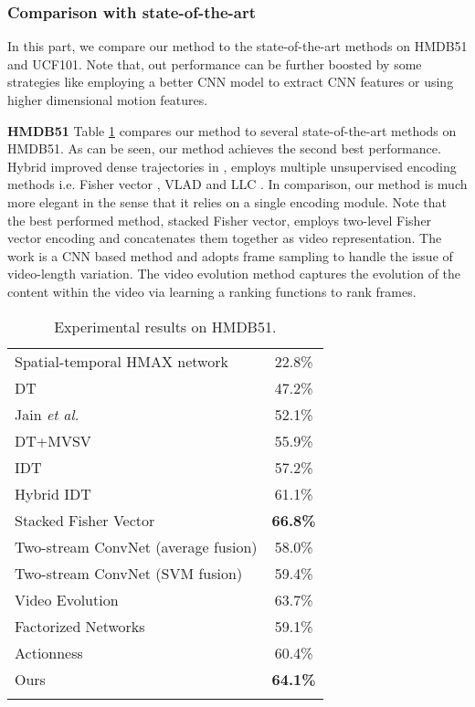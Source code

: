 \documentclass[journal]{IEEEtran}
\begin{document}
\subsubsection{Comparison with state-of-the-art}
In this part, we compare our method to the state-of-the-art methods on HMDB51 and UCF101. Note that, out performance can be further boosted by some strategies like employing a better CNN model \cite{Simonyan15} to extract CNN features or using higher dimensional motion features.

\noindent \textbf{HMDB51}
Table \ref{tab:overall-hmdb51} compares our method to several state-of-the-art methods on HMDB51. As can be seen, our method achieves the second best performance. Hybrid improved dense trajectories in \cite{peng14}, employs multiple unsupervised encoding methods i.e. Fisher vector \cite{Perronnin:2010}, VLAD \cite{VLAD} and LLC \cite{llc}. In comparison, our method is much more elegant in the sense that it relies on a single encoding module. Note that the best performed method, stacked Fisher vector, \cite{peng:stack} employs two-level Fisher vector encoding and concatenates them together as video representation. The work \cite{Andrew14} is a CNN based method and adopts frame sampling to handle the issue of video-length variation. The video evolution method \cite{Fernando2015a} captures the evolution of the content within the video via learning a ranking functions to rank frames.

\begin{table}[htbp]\normalsize
\caption{Experimental results on HMDB51.}
  \centering

  \renewcommand{\arraystretch}{1.1}
    \begin{tabular*}{8cm}{lc}
    \hline \noalign{\smallskip}
    Spatial-temporal HMAX network \cite{Kuehne11} & 22.8\% \\
    DT \cite{wang:2011} & 47.2\% \\
    Jain \textit{et al.} \cite{6619174} & 52.1\% \\
    DT+MVSV \cite{6909477} &55.9\% \\
    IDT \cite{Wang2013} & 57.2\% \\
    Hybrid IDT \cite{peng14} & 61.1\% \\
    Stacked Fisher Vector \cite{peng:stack} & \textbf{66.8\%} \\
    Two-stream ConvNet (average fusion) \cite{Andrew14} & 58.0\% \\
    Two-stream ConvNet (SVM fusion) \cite{Andrew14} & 59.4\% \\
    Video Evolution \cite{Fernando2015a} & 63.7\% \\
    Factorized Networks \cite{Sun_2015_ICCV} & 59.1\% \\
    Actionness \cite{Luo_2015_ICCV} & 60.4\% \\
    Ours & \textbf{64.1\%}
    \\ \hline \noalign{\smallskip}
    \end{tabular*}%

  \label{tab:overall-hmdb51}%
\end{table}%
\end{document}

